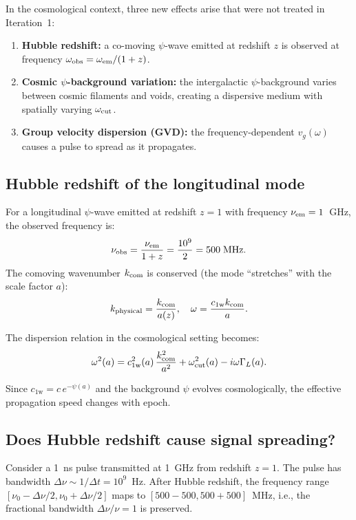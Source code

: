 \documentclass[11pt]{article}
\newcommand{\cfield}{c_{1\mathrm{w}}}
\begin{document}
In the cosmological context, three new effects arise that were not
treated in Iteration~1:
\begin{enumerate}
\item \textbf{Hubble redshift:} a co-moving $\psi$-wave emitted at
redshift $z$ is observed at frequency $\omega_{\rm obs} = \omega_{\rm em}/(1+z)$.
\item \textbf{Cosmic $\psi$-background variation:} the intergalactic
$\psi$-background varies between cosmic filaments and voids,
creating a dispersive medium with spatially varying $\omega_{\rm cut}$.
\item \textbf{Group velocity dispersion (GVD):} the frequency-dependent
$v_g(\omega)$ causes a pulse to spread as it propagates.
\end{enumerate}

\subsection{Hubble redshift of the longitudinal mode}

For a longitudinal $\psi$-wave emitted at redshift $z = 1$ with
frequency $\nu_{\rm em} = 1$~GHz, the observed frequency is:
\begin{equation}
\nu_{\rm obs} = \frac{\nu_{\rm em}}{1+z} = \frac{10^9}{2} = 500\;\text{MHz}.
\end{equation}
The comoving wavenumber $k_{\rm com}$ is conserved (the mode
``stretches'' with the scale factor $a$):
\begin{equation}
k_{\rm physical} = \frac{k_{\rm com}}{a(z)}, \quad \omega = \frac{\cfield k_{\rm com}}{a}.
\end{equation}

The dispersion relation in the cosmological setting becomes:
\begin{equation}
\omega^2(a) = \cfield^2(a)\,\frac{k_{\rm com}^2}{a^2} + \omega_{\rm cut}^2(a) - i\omega\Gamma_L(a).
\end{equation}

Since $\cfield = c\,e^{-\psi(a)}$ and the background $\psi$ evolves
cosmologically, the effective propagation speed changes with epoch.

\subsection{Does Hubble redshift cause signal spreading?}

Consider a 1~ns pulse transmitted at 1~GHz from redshift $z=1$.
The pulse has bandwidth $\Delta\nu \sim 1/\Delta t = 10^9$~Hz.
After Hubble redshift, the frequency range $[\nu_0 - \Delta\nu/2,
\nu_0 + \Delta\nu/2]$ maps to $[500 - 500, 500 + 500]$~MHz, i.e.,
the fractional bandwidth $\Delta\nu/\nu = 1$ is preserved.
\end{document}
